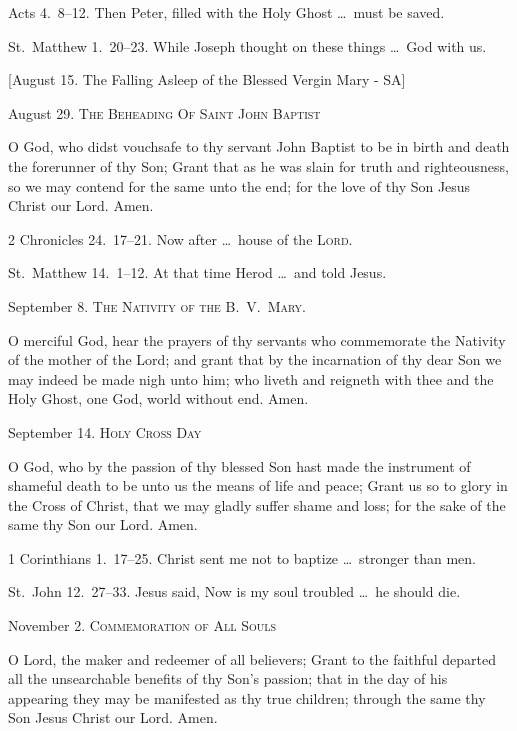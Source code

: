  Acts 4.~8–12.   Then Peter, filled with the Holy Ghost \ldots\ must be saved.

 St.~Matthew 1.~20–23.   While Joseph thought on these things \ldots\ God with us.

\medskip

[August 15. The Falling Asleep of the Blessed Vergin Mary - SA]

\medskip

\noindent August 29. {\scshape The Beheading Of Saint John Baptist}

 O God, who didst vouchsafe to thy servant John Baptist to be in birth and death the forerunner of thy Son; Grant that as he was slain for truth and righteousness, so we may contend for the same unto the end; for the love of thy Son Jesus Christ our Lord. \R Amen.

 2 Chronicles 24.~17–21.   Now after \ldots\ house of the {\scshape Lord}.

 St.~Matthew 14.~1–12.   At that time Herod \ldots\ and told Jesus.

\medskip

\noindent September 8. {\scshape The Nativity of the B.~V.~Mary.}

 O merciful God, hear the prayers of thy servants who commemorate the Nativity of the mother of the Lord; and grant that by the incarnation of thy dear Son we may indeed be made nigh unto him; who liveth and reigneth with thee and the Holy Ghost, one God, world without end. \R Amen.

\medskip

\noindent September 14. {\scshape Holy Cross Day}

 O God, who by the passion of thy blessed Son hast made the instrument of shameful death to be unto us the means of life and peace; Grant us so to glory in the Cross of Christ, that we may gladly suffer shame and loss; for the sake of the same thy Son our Lord. \R Amen.

 1 Corinthians 1.~17–25.   Christ sent me not to baptize \ldots\ stronger than men.

 St.~John 12.~27–33.   Jesus said, Now is my soul troubled \ldots\ he should die.

\medskip

\noindent November 2. {\scshape Commemoration of All Souls}

 O Lord, the maker and redeemer of all believers; Grant to the faithful departed all the unsearchable benefits of thy Son’s passion; that in the day of his appearing they may be manifested as thy true children; through the same thy Son Jesus Christ our Lord. \R Amen.


